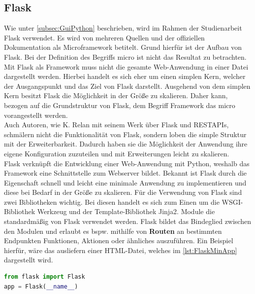 \documentclass[a4paper,titlepage,halfparskip,12pt]{scrreprt}
\begin{document}
\begin{onehalfspacing}
\subsection{Flask}
\label{subsec:Flask}
Wie unter \autoref{subsec:GuiPython} beschrieben, wird im Rahmen der Studienarbeit Flask verwendet. Es wird von mehreren Quellen und der offiziellen Dokumentation als Microframework betitelt. Grund hierfür ist der Aufbau von Flask. Bei der Definition des Begriffs \glqq micro\grqq{} ist nicht das Resultat zu betrachten. Mit Flask als Framework muss nicht die gesamte Web-Anwendung in einer Datei dargestellt werden. Hierbei handelt es sich eher um einen simplen Kern, welcher der Ausgangspunkt und das Ziel von Flask darstellt. Ausgehend von dem simplen Kern besitzt Flask die Möglichkeit in der Größe zu skalieren. Daher kann, bezogen auf die Grundstruktur von Flask, dem Begriff Framework das \glqq micro\grqq{} vorangestellt werden.\cite{FlaskDoc}\\
Auch Autoren, wie K. Relan mit seinem Werk über Flask und RESTAPIs, schmälern nicht die Funktionalität von Flask, sondern loben die simple Struktur mit der Erweiterbarkeit. Dadurch haben sie die Möglichkeit der Anwendung ihre eigene Konfiguration zuzuteilen und mit Erweiterungen leicht zu skalieren. \cite{FlaskRESTAPIsRelan}\\
Flask verknüpft die Entwicklung einer Web-Anwendung mit Python, weshalb das Framework eine Schnittstelle zum Webserver bildet. Bekannt ist Flask durch die Eigenschaft schnell und leicht eine minimale Anwendung zu implementieren und diese bei Bedarf in der Größe zu skalieren. Für die Verwendung von Flask sind zwei Bibliotheken wichtig. Bei diesen handelt es sich zum Einen um die \ac{WSGI}-Bibliothek Werkzeug und der Template-Bibliothek Jinja2. Module die standardmäßig von Flask verwendet werden. Flask bildet das Bindeglied zwischen den Modulen und erlaubt es bspw. mithilfe von \textbf{Routen} an bestimmten Endpunkten Funktionen, Aktionen oder ähnliches auszuführen. Ein Beispiel hierfür, wäre das ausliefern einer \ac{HTML}-Datei, welches im \autoref{lst:FlaskMinApp} dargestellt wird.
\begin{lstlisting}[language=Python,caption=Example Listing of Flask Python,label={lst:FlaskMinApp}]
from flask import Flask
app = Flask(__name__)


\end{lstlisting}
\end{onehalfspacing}
\end{document}
